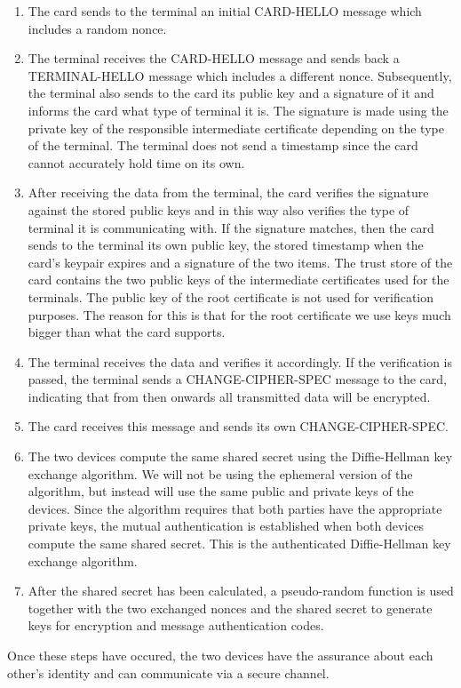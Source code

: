 \begin{enumerate}
 \item The card sends to the terminal an initial CARD-HELLO message which includes a random nonce.
 \item The terminal receives the CARD-HELLO message and sends back a TERMINAL-HELLO message which includes a different nonce. Subsequently, the terminal also sends to the card its public key and a signature of it and informs the card what type of terminal it is. The signature is made using the private key of the responsible intermediate certificate depending on the type of the terminal. The terminal does not send a timestamp since the card cannot accurately hold time on its own.
 \item After receiving the data from the terminal, the card verifies the signature against the stored public keys and in this way also verifies the type of terminal it is communicating with. If the signature matches, then the card sends to the terminal its own public key, the stored timestamp when the card's keypair expires and a signature of the two items. The trust store of the card contains the two public keys of the intermediate certificates used for the terminals. The public key of the root certificate is not used for verification purposes. The reason for this is that for the root certificate we use keys much bigger than what the card supports.
 \item The terminal receives the data and verifies it accordingly. If the verification is passed, the terminal sends a CHANGE-CIPHER-SPEC message to the card, indicating that from then onwards all transmitted data will be encrypted.
 \item The card receives this message and sends its own CHANGE-CIPHER-SPEC.
 \item The two devices compute the same shared secret using the Diffie-Hellman key exchange algorithm. We will not be using the ephemeral version of the algorithm, but instead will use the same public and private keys of the devices. Since the algorithm requires that both parties have the appropriate private keys, the mutual authentication is established when both devices compute the same shared secret. This is the authenticated Diffie-Hellman key exchange algorithm.
 \item After the shared secret has been calculated, a pseudo-random function is used together with the two exchanged nonces and the shared secret to generate keys for encryption and message authentication codes.
\end{enumerate}

Once these steps have occured, the two devices have the assurance about each other's identity and can communicate via a secure channel.
